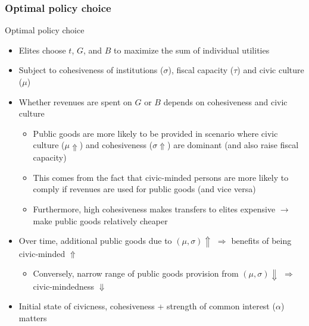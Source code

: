 \documentclass[aspectratio=169]{beamer}
\begin{document}
\begin{frame}
\frametitle{Optimal policy choice}  
Optimal policy choice
\begin{itemize}\setlength\itemsep{3pt}
\item Elites choose $t$, $G$, and $B$ to maximize the sum of individual utilities
\item Subject to cohesiveness of institutions ($\sigma$), fiscal capacity ($\tau$) and civic culture ($\mu$)
\item Whether revenues are spent on $G$ or $B$ depends on cohesiveness and civic culture
\begin{itemize}
\item Public goods are more likely to be provided in scenario where civic culture ($\mu\Uparrow$) and cohesiveness ($\sigma\Uparrow$) are dominant (and also raise fiscal capacity)
\item This comes from the fact that civic-minded persons are more likely to comply if revenues are used for public goods (and vice versa)
\item Furthermore, high cohesiveness makes transfers to elites expensive $\to$ make public goods relatively cheaper
\end{itemize}
\item Over time, additional public goods due to $(\mu, \sigma) \Uparrow$ $\Rightarrow$ benefits of being civic-minded $\Uparrow$
\begin{itemize}
\item Conversely, narrow range of public goods provision from $(\mu, \sigma) \Downarrow$ $\Rightarrow$ civic-mindedness $\Downarrow$
\end{itemize}
\item Initial state of civicness, cohesiveness + strength of common interest ($\alpha$) matters
\end{itemize}\medskip
\end{frame}
\end{document}
